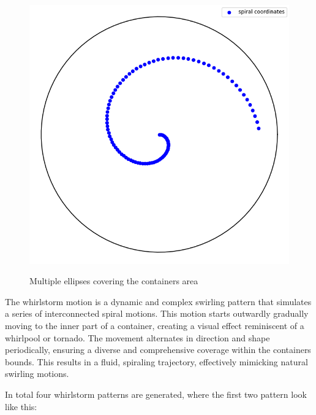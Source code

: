 \begin{figure}[H]
    \includegraphics[scale=0.35]{Graphics/motions/whirlstorm1.png}
    \centering
    \label{fig:foldingMotion1}
    \caption{Multiple ellipses covering the containers area}
\end{figure}


The whirlstorm motion is a dynamic and complex swirling pattern that simulates a series of interconnected spiral motions. 
This motion starts outwardly gradually moving to the inner part of a container, creating a visual effect reminiscent of a whirlpool or tornado. 
The movement alternates in direction and shape periodically, ensuring a diverse and comprehensive coverage within the containers bounds.
This results in a fluid, spiraling trajectory, effectively mimicking natural swirling motions.

In total four whirlstorm patterns are generated, where the first two pattern look like this:

